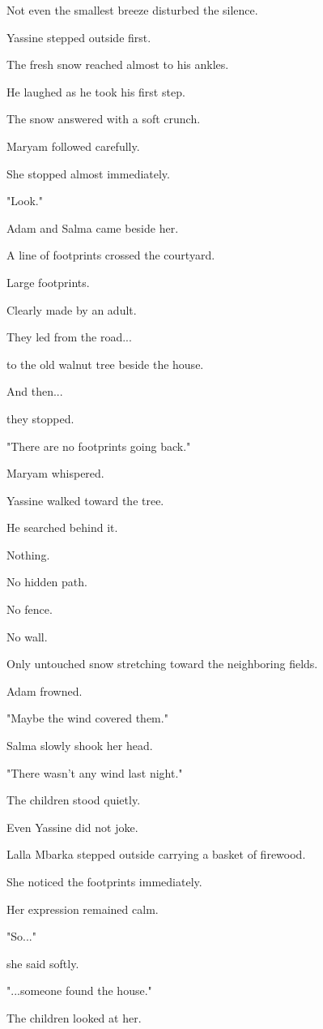 \documentclass[12pt,openany]{book}
\begin{document}
Not even the smallest breeze disturbed the silence.

Yassine stepped outside first.

The fresh snow reached almost to his ankles.

He laughed as he took his first step.

The snow answered with a soft crunch.

Maryam followed carefully.

She stopped almost immediately.

"Look."

Adam and Salma came beside her.

A line of footprints crossed the courtyard.

Large footprints.

Clearly made by an adult.

They led from the road...

to the old walnut tree beside the house.

And then...

they stopped.

"There are no footprints going back."

Maryam whispered.

Yassine walked toward the tree.

He searched behind it.

Nothing.

No hidden path.

No fence.

No wall.

Only untouched snow stretching toward the neighboring fields.

Adam frowned.

"Maybe the wind covered them."

Salma slowly shook her head.

"There wasn't any wind last night."

The children stood quietly.

Even Yassine did not joke.

Lalla Mbarka stepped outside carrying a basket of firewood.

She noticed the footprints immediately.

Her expression remained calm.

"So..."

she said softly.

"...someone found the house."

The children looked at her.
\end{document}

